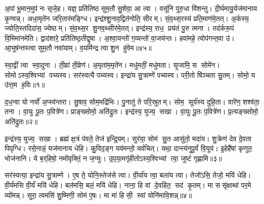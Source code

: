 अ॒पां भू॒मान॒मुप॑ नः सृजे॒ह। यज्ञ॒ प्रति॑तिष्ठ सुम॒तौ सु॒शेवा॒ आ त्वा। वसू॑नि पुरु॒धा वि॑शन्तु। दी॒र्घमायु॒र्यज॑मानाय कृ॒ण्वन्न्। अधा॒मृते॑न जरि॒तार॑मङ्ग्धि। इन्द्र॑श्शु॒नाव॒द्वित॑नोति॒ सीरम्। सं॒व॒थ्स॒रस्य॑ प्रति॒माण॑मे॒तत्। अ॒र्कस्य॒ ज्योति॒स्तदिदा॑स॒ ज्येष्ठम्। सं॒व॒थ्स॒र शु॒नव॒थ्सीर॑मे॒तत्। इन्द्र॑स्य॒ राध॒ प्रय॑तं पु॒रु त्मना। तद॑र्करू॒पं वि॒मिमा॑नमेति। द्वाद॑शारे॒ प्रति॑तिष्ठ॒तीद्वृषा। अ॒श्वा॒यन्तो॑ ग॒व्यन्तो॑ वा॒जय॑न्तः। हवा॑महे॒ त्वोप॑गन्त॒वा उ॑। आ॒भूष॑न्तस्त्वा सुम॒तौ नवा॑याम्। व॒यमि॑न्द्र त्वा शु॒न हु॑वेम॥४५॥



\clearpage
{}
\setcounter{anuvakam}{0}
स्वा॒द्वीं त्वा स्वा॒दुना। ती॒व्रां ती॒व्रेण॑। अ॒मृता॑म॒मृते॑न। मधु॑मतीं॒ मधु॑मता। सृ॒जामि॒ स सोमे॑न। सोमोऽस्य॒श्विभ्यां पच्यस्व। सर॑स्वत्यै पच्यस्व। इन्द्रा॑य सु॒त्राम्णे॑ पच्यस्व। परी॒तो षि॑ञ्चता सु॒तम्। सोमो॒ य उ॑त्त॒म ह॒विः॥१॥

द॒ध॒न्वा यो नर्यो॑ अ॒प्स्व॑न्तरा। सु॒षाव॒ सोम॒मद्रि॑भिः। पु॒नातु॑ ते परि॒स्रुतम्। सोम॒ सूर्य॑स्य दुहि॒ता। वारे॑ण॒ शश्व॑ता॒ तना। वा॒युः पू॒तः प॒वित्रे॑ण। प्राङ्ख्सोमो॒ अति॑द्रुतः। इन्द्र॑स्य॒ युज्य॒ सखा। वा॒युः पू॒तः प॒वित्रे॑ण। प्र॒त्यङ्ख्सोमो॒ अति॑द्रुतः॥२॥

इन्द्र॑स्य॒ युज्य॒ सखा। ब्रह्म॑ क्ष॒त्रं प॑वते॒ तेज॑ इन्द्रि॒यम्। सुर॑या॒ सोम॑ सु॒त आसु॑तो॒ मदा॑य। शु॒क्रेण॑ देव दे॒वता पिपृग्धि। रसे॒नान्नं॒ यज॑मानाय धेहि। कु॒विद॒ङ्ग यव॑मन्तो॒ यवं॑चित्। यथा॒ दान्त्य॑नुपू॒र्वं वि॒यूय॑। इ॒हेहै॑षां कृणुत॒ भोज॑नानि। ये ब॒र्‌हिषो॒ नमो॑वृक्तिं॒ न ज॒ग्मुः। उ॒प॒या॒मगृ॑हीतोऽस्य॒श्विभ्यां त्वा॒ जुष्टं॑ गृह्णामि॥३॥

सर॑स्वत्या॒ इन्द्रा॑य सु॒त्राम्णे। ए॒ष ते॒ योनि॒स्तेज॑से त्वा। वी॒र्या॑य त्वा॒ बला॑य त्वा। तेजो॑ऽसि॒ तेजो॒ मयि॑ धेहि। वी॒र्य॑मसि वी॒र्यं॑ मयि॑ धेहि। बल॑मसि॒ बलं॒ मयि॑ धेहि। नाना॒ हि वां दे॒वहि॑त॒ सद॑ कृ॒तम्। मा ससृ॑क्षाथां पर॒मे व्यो॑मन्न्। सुरा॒ त्वमसि॑ शु॒ष्मिणी॒ सोम॑ ए॒षः। मा मा॑ हिसी॒ स्वां योनि॑मावि॒शन्न्॥४॥

